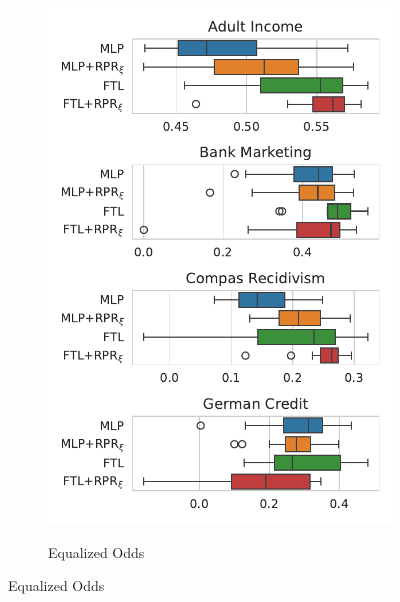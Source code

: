 \begin{figure}[!ht]
\begin{subfigure}{.32\linewidth}
    \includegraphics[width=1\linewidth]{images/boxplot_mcc_opportunity_rpr.pdf}
\end{subfigure}
\begin{subfigure}{.32\linewidth}
    \caption{Equalized Odds}
    \label{fig:boxplot_mcc_odds_rpr}

\end{subfigure}
\end{figure}
